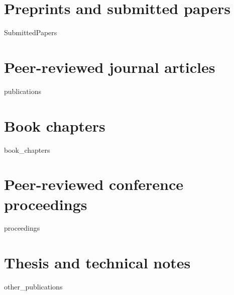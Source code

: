 \documentclass[11pt,a4paper]{article}
\begin{document}

\nocite{*}

\section{Preprints and submitted papers}
\begin{btSect}[cvunsrt]{SubmittedPapers}
\btPrintAll
\end{btSect}

\section{Peer-reviewed journal articles}
\begin{btSect}[cvunsrt]{publications}
\btPrintAll
\end{btSect}

\section{Book chapters}
\begin{btSect}[cvunsrt]{book_chapters}
\btPrintAll
\end{btSect}

\section{Peer-reviewed conference proceedings}
\begin{btSect}[cvunsrt]{proceedings}
\btPrintAll
\end{btSect}

\section{Thesis and technical notes}
\begin{btSect}[cvunsrt]{other_publications}
\btPrintAll
\end{btSect}
\end{document}
